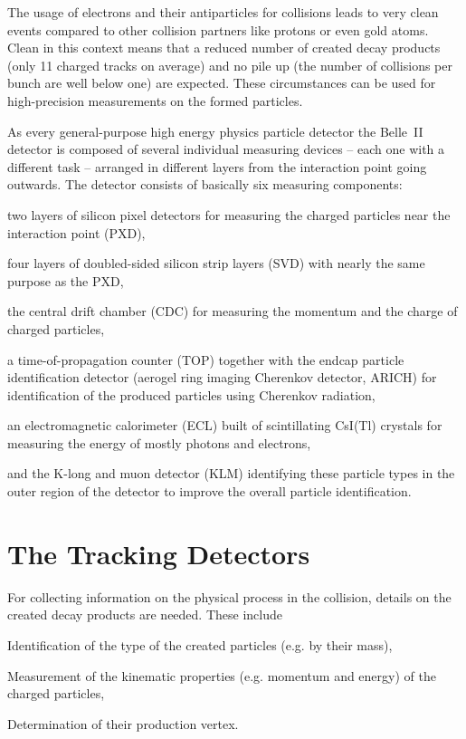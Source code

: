 The usage of electrons and their antiparticles for collisions leads to very clean events compared to other collision partners like protons or even gold atoms. Clean in this context means that a reduced number of created decay products (only 11 charged tracks on average) and no pile up (the number of collisions per bunch are well below one) are expected. These circumstances can be used for high-precision measurements on the formed particles.

As every general-purpose high energy physics particle detector the Belle~II detector is composed of several individual measuring devices -- each one with a different task -- arranged in different layers from the interaction point going outwards. The detector consists of basically six measuring components:
\begin{zlist}
  \item two layers of silicon pixel detectors for measuring the charged particles near the interaction point (PXD),
  \item four layers of doubled-sided silicon strip layers (SVD) with nearly the same purpose as the PXD,
  \item the central drift chamber (CDC) for measuring the momentum and the charge of charged particles,
  \item a time-of-propagation counter (TOP) together with the endcap particle identification detector (aerogel ring imaging Cherenkov detector, ARICH) for identification of the produced particles using Cherenkov radiation,
  \item an electromagnetic calorimeter (ECL) built of scintillating CsI(Tl) crystals for measuring the energy of mostly photons and electrons,
  \item and the K-long and muon detector (KLM) identifying these particle types in the outer region of the detector to improve the overall particle identification.
\end{zlist}

\section{The Tracking Detectors}

For collecting information on the physical process in the collision, details on the created decay products are needed. These include
\begin{zlist}
 \item Identification of the type of the created particles (e.g. by their mass),
 \item Measurement of the kinematic properties (e.g. momentum and energy) of the charged particles,
 \item Determination of their production vertex.
\end{zlist}

